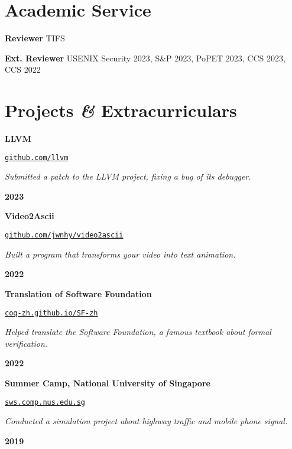 \documentclass{resume}
\begin{document}
\section{Academic Service}
\begin{content}
  {\bf Reviewer} \enspace TIFS

  {\bf Ext. Reviewer} \enspace USENIX Security 2023, S\&P 2023, PoPET 2023, CCS 2023, CCS 2022
\end{content}

\section{Projects \textbf{\em\&} Extracurriculars} 

\begin{content}
	{\bf LLVM} \enspace 
	{\href{https://github.com/llvm/}{\texttt{github.com/llvm}}
		
	{\em Submitted a patch to the LLVM project, fixing a bug of its debugger.} }
	\hfill {\bf 2023}
	
    {\bf Video2Ascii} \enspace 
    {\href{https://github.com/jwnhy/video2ascii}{\texttt{github.com/jwnhy/video2ascii}}
    	
    {\em Built a program that transforms your video into text animation.} }
    \hfill {\bf 2022}
    
    {\bf Translation of Software Foundation} \enspace
    {\href{https://coq-zh.github.io/SF-zh/}{\texttt{coq-zh.github.io/SF-zh}}
    
    {\em Helped translate the Software Foundation, a famous textbook 
    about formal verification.}}
	\hfill {\bf 2022}
    
    {\bf Summer Camp, National University of Singapore} \enspace
    {\href{https://sws.comp.nus.edu.sg/}{\texttt{sws.comp.nus.edu.sg}}
    
    {\em Conducted a simulation project about highway traffic and mobile phone 
    signal.}}
    \hfill {\bf 2019}

\sectionlineskip    
\end{content}
\end{document}
